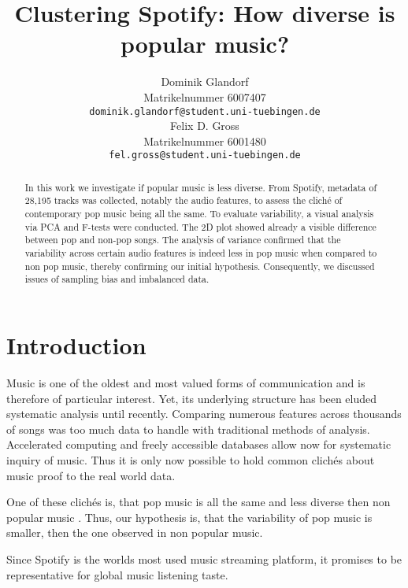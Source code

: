 \documentclass{article}
\title{Clustering Spotify: How diverse is popular music?}
\author{%
  Dominik Glandorf\\
  Matrikelnummer 6007407\\
  \texttt{dominik.glandorf@student.uni-tuebingen.de} \\
  \And
  Felix D. Gross\\
  Matrikelnummer 6001480\\
  \texttt{fel.gross@student.uni-tuebingen.de} \\
}
\begin{document}
\maketitle

\begin{abstract}
{In this work we investigate if popular music is less diverse. From Spotify, metadata of 28,195 tracks was collected, notably the audio features, to assess the cliché of contemporary pop music being all the same. To evaluate variability, a visual analysis via PCA and F-tests were conducted. The 2D plot showed already a visible difference between pop and non-pop songs. The analysis of variance confirmed that the variability across certain audio features is indeed less in pop music when compared to non pop music, thereby confirming our initial hypothesis. Consequently, we discussed issues of sampling bias and imbalanced data.}
  
\end{abstract}

\section{Introduction}

Music is one of the oldest and most valued forms of communication and is therefore of particular interest. Yet, its underlying structure has been eluded systematic analysis until recently. Comparing numerous features across thousands of songs was too much data to handle with traditional methods of analysis. Accelerated computing and freely accessible databases allow now for systematic inquiry of music. Thus it is only now possible to hold common clichés about music proof to the real world data.

One of these clichés is, that pop music is all the same and less diverse then non popular music \citep[see for example][]{serra2012measuring}. Thus, our hypothesis is, that the variability of pop music is smaller, then the one observed in non popular music.

Since Spotify is the worlds most used music streaming platform, it promises to be representative for global music listening taste.

\end{document}
